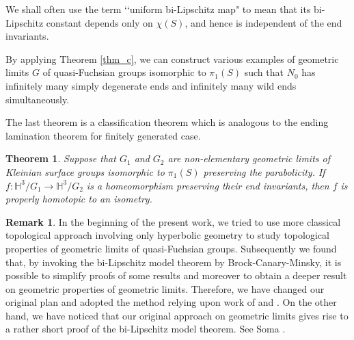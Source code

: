 \documentclass{amsart}
\newtheorem{mtheorem}{Theorem}
\theoremstyle{definition}
\newtheorem{remark}[theorem]{Remark}
\numberwithin{figure}{section}
\numberwithin{equation}{section}
\newcommand{\blackboard}[1]{\ensuremath{\mathbb{#1}}}
\newcommand{\hyperbolic}{\blackboard{H}}
\def\hh{\hyperbolic}
\begin{document}
We shall often use the term \lq\lq uniform bi-Lipschitz map" to mean that its bi-Lipschitz constant depends only on 
$\chi(S)$, and hence is independent of the end invariants.


By applying Theorem \ref{thm_c}, we can construct various examples of geometric limits $G$ of quasi-Fuchsian 
groups isomorphic to $\pi_1(S)$  such that $N_0$ has infinitely many simply degenerate ends and infinitely many wild ends simultaneously.



The last theorem is a classification theorem which is analogous to the ending lamination theorem for finitely generated case.

\begin{mtheorem}\label{thm_d}
Suppose that $G_1$ and $G_2$ are non-elementary geometric limits of Kleinian surface groups isomorphic to $\pi_1(S)$ preserving the parabolicity.
If $f:\hh^3/G_1\rightarrow \hh^3/G_2$ is a homeomorphism preserving their end invariants, then $f$ is properly homotopic to an isometry.
\end{mtheorem}




\begin{remark}
In the beginning of the present work, we tried to use more classical topological approach involving only hyperbolic geometry to study topological properties of geometric limits of quasi-Fuchsian groups.
Subsequently we found that, by invoking the bi-Lipschitz model theorem by Brock-Canary-Minsky,  it is possible to  
simplify proofs of some results and moreover to obtain a deeper result on geometric properties of geometric limits.
Therefore, we have changed our original plan and adopted   the method relying upon work of \cite{mi2} and \cite{bcm}.
 On the other hand, we have noticed that our original approach on geometric limits 
gives rise to  a rather short proof of the bi-Lipschitz model theorem.
See Soma \cite{so}.
\end{remark}
\end{document}

